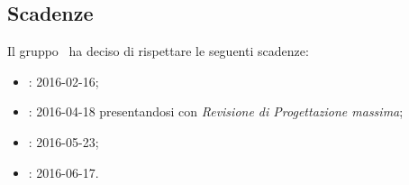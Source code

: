 \subsection{Scadenze}
Il gruppo \gruppo\ ha deciso di rispettare le seguenti scadenze:
\begin{itemize}
	\item \textbf{\RR}: 2016-02-16;
	\item \textbf{\RP}: 2016-04-18 presentandosi con \textit{Revisione di Progettazione massima};
	\item \textbf{\RQ}: 2016-05-23;
	\item \textbf{\RA}: 2016-06-17.
\end{itemize}
